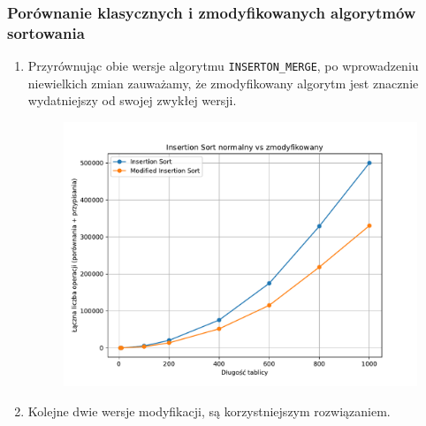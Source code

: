 \documentclass{article}
\begin{document}
\subsubsection*{Porównanie klasycznych i zmodyfikowanych algorytmów sortowania}

\begin{enumerate}
 \item Przyrównując obie wersje algorytmu \texttt{INSERTON\_MERGE}, po wprowadzeniu niewielkich zmian zauważamy, że zmodyfikowany algorytm jest znacznie wydatniejszy od swojej zwykłej wersji.
  \begin{figure}[H]
 	\centering
 	\includegraphics[width=1\textwidth]{Figure_1.1.pdf}
 \end{figure}
 \item Kolejne dwie wersje modyfikacji, są korzystniejszym rozwiązaniem.


\end{enumerate}
\end{document}
